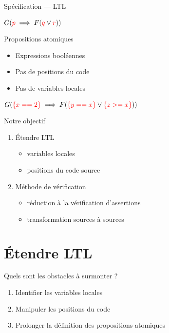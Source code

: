 \documentclass{beamer}
\begin{document}
\begin{frame}{Spécification --- LTL}
    \begin{center}
      $G(\textcolor{red}{p} \implies F (\textcolor{red}{q}
      \lor \textcolor{red}{r}))$
    \end{center}
  \begin{block}{Propositions atomiques}
    \begin{itemize}
      \item Expressions booléennes
      \item Pas de positions du code
      \item Pas de variables locales
    \end{itemize}
  \end{block}
    \begin{center}
      $G(\textcolor{red}{\{x == 2\}} \implies F
      (\textcolor{red}{\{y == x\}}
      \lor \textcolor{red}{\{z >= x\}}))$
    \end{center}
\end{frame}

\begin{frame}[standout]{Notre objectif}
  \begin{enumerate}
    \setlength{\itemsep}{2em}
  \item Étendre LTL
    \begin{itemize}
      \item variables locales
      \item positions du code source
    \end{itemize}
  \item Méthode de vérification
    \begin{itemize}
      \item réduction à la vérification d'assertions
      \item transformation sources à sources
    \end{itemize}
  \end{enumerate}
\end{frame}

\section{Étendre LTL}

\begin{frame}{Quels sont les obstacles à surmonter ?}
    \begin{enumerate}
    \item Identifier les variables locales
    \item Manipuler les positions du code
    \item \alert<2>{Prolonger la définition des propositions atomiques}
    \end{enumerate}
\end{frame}
\end{document}
